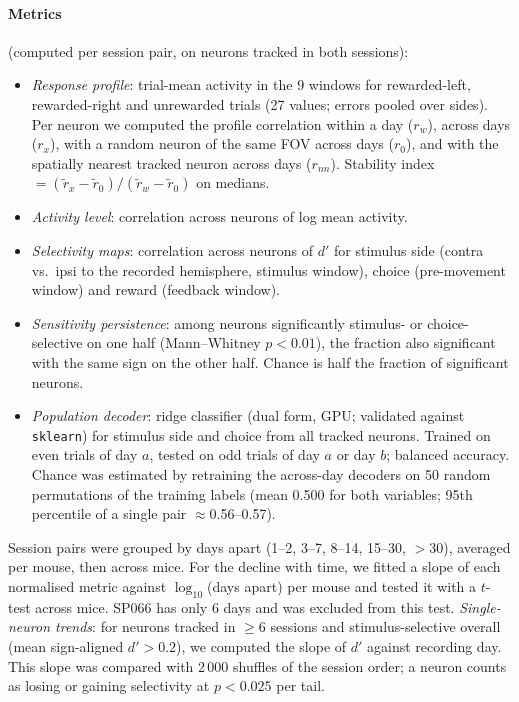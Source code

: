 \documentclass[10pt,a4paper]{article}
\begin{document}
\paragraph{Metrics} (computed per session pair, on neurons tracked in both sessions):
\begin{itemize}\itemsep0pt
\item \emph{Response profile}: trial-mean activity in the 9 windows for rewarded-left, rewarded-right and unrewarded trials (27 values; errors pooled over sides).
Per neuron we computed the profile correlation within a day ($r_w$), across days ($r_x$), with a random neuron of the same FOV across days ($r_0$), and with the spatially nearest tracked neuron across days ($r_{nn}$).
Stability index $=(\tilde r_x-\tilde r_0)/(\tilde r_w-\tilde r_0)$ on medians.
\item \emph{Activity level}: correlation across neurons of log mean activity.
\item \emph{Selectivity maps}: correlation across neurons of $d'$ for stimulus side (contra vs.\ ipsi to the recorded hemisphere, stimulus window), choice (pre-movement window) and reward (feedback window).
\item \emph{Sensitivity persistence}: among neurons significantly stimulus- or choice-selective on one half (Mann--Whitney $p<0.01$), the fraction also significant with the same sign on the other half. Chance is half the fraction of significant neurons.
\item \emph{Population decoder}: ridge classifier (dual form, GPU; validated against \texttt{sklearn}) for stimulus side and choice from all tracked neurons. Trained on even trials of day $a$, tested on odd trials of day $a$ or day $b$; balanced accuracy. Chance was estimated by retraining the across-day decoders on 50 random permutations of the training labels (mean 0.500 for both variables; 95th percentile of a single pair $\approx$0.56--0.57).
\end{itemize}
Session pairs were grouped by days apart (1--2, 3--7, 8--14, 15--30, $>$30), averaged per mouse, then across mice.
For the decline with time, we fitted a slope of each normalised metric against $\log_{10}$(days apart) per mouse and tested it with a $t$-test across mice.
SP066 has only 6 days and was excluded from this test.
\emph{Single-neuron trends}: for neurons tracked in $\geq$6 sessions and stimulus-selective overall (mean sign-aligned $d'>0.2$), we computed the slope of $d'$ against recording day.
This slope was compared with 2\,000 shuffles of the session order; a neuron counts as losing or gaining selectivity at $p<0.025$ per tail.
\end{document}
